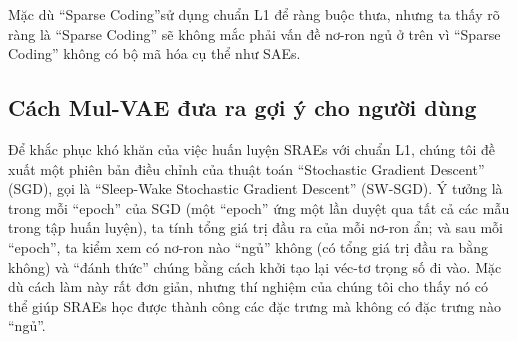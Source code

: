 Mặc dù ``Sparse Coding''sử dụng chuẩn L1 để ràng buộc thưa, nhưng ta thấy rõ ràng là ``Sparse Coding'' sẽ không mắc phải vấn đề nơ-ron ngủ ở trên vì ``Sparse Coding'' không có bộ mã hóa cụ thể như SAEs.
\subsection{Cách Mul-VAE đưa ra gợi ý cho người dùng}
Để khắc phục khó khăn của việc huấn luyện SRAEs với chuẩn L1, chúng tôi đề xuất một phiên bản điều chỉnh của thuật toán ``Stochastic Gradient Descent'' (SGD), gọi là ``Sleep-Wake Stochastic Gradient Descent'' (SW-SGD). Ý tưởng là trong mỗi ``epoch'' của SGD (một ``epoch'' ứng một lần duyệt qua tất cả các mẫu trong tập huấn luyện), ta tính tổng giá trị đầu ra của mỗi nơ-ron ẩn; và sau mỗi ``epoch'', ta kiểm xem có nơ-ron nào ``ngủ'' không (có tổng giá trị đầu ra bằng không) và ``đánh thức'' chúng bằng cách khởi tạo lại véc-tơ trọng số đi vào. Mặc dù cách làm này rất đơn giản, nhưng thí nghiệm của chúng tôi cho thấy nó có thể giúp SRAEs học được thành công các đặc trưng mà không có đặc trưng nào ``ngủ''.

